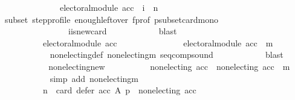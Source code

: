 \begin{isabellebody}
\ \ \ \ \ \ \ \ \ \ \ \ \ \ {\isacharparenleft}{\kern0pt}electoral{\isacharunderscore}{\kern0pt}module\ acc\ {\isasymlongrightarrow}\ i\ {\isacharless}{\kern0pt}\ n{\isacharparenright}{\kern0pt}{\isachardoublequoteclose}\ \isanewline
\ \ \ \ \ \ \ \ \ \ \isamarkupfalse%
\ subset\ step{\isacharunderscore}{\kern0pt}profile\ enough{\isacharunderscore}{\kern0pt}leftover\ f{\isacharunderscore}{\kern0pt}prof\ psubset{\isacharunderscore}{\kern0pt}card{\isacharunderscore}{\kern0pt}mono\isanewline
\ \ \ \ \ \ \ \ \ \ \ \ \ \ \ \ i{\isacharunderscore}{\kern0pt}is{\isacharunderscore}{\kern0pt}new{\isacharunderscore}{\kern0pt}card\isanewline
\ \ \ \ \ \ \ \ \ \ \isamarkupfalse%
\ blast\isanewline
\ \ \ \ \ \ \ \ \isamarkupfalse%
\ \isamarkupfalse%
\isanewline
\ \ \ \ \ \ \ \ \ \ {\isachardoublequoteopen}electoral{\isacharunderscore}{\kern0pt}module\ acc\ {\isasymlongrightarrow}\isanewline
\ \ \ \ \ \ \ \ \ \ \ \ \ \ electoral{\isacharunderscore}{\kern0pt}module\ {\isacharparenleft}{\kern0pt}acc\ {\isasymtriangleright}\ m{\isacharparenright}{\kern0pt}{\isachardoublequoteclose}\ \isanewline
\ \ \ \ \ \ \ \ \ \ \isamarkupfalse%
\ non{\isacharunderscore}{\kern0pt}electing{\isacharunderscore}{\kern0pt}def\ non{\isacharunderscore}{\kern0pt}electing{\isacharunderscore}{\kern0pt}m\ seq{\isacharunderscore}{\kern0pt}comp{\isacharunderscore}{\kern0pt}sound\isanewline
\ \ \ \ \ \ \ \ \ \ \isamarkupfalse%
\ blast\isanewline
\ \ \ \ \ \ \ \ \isamarkupfalse%
\ \isamarkupfalse%
\ non{\isacharunderscore}{\kern0pt}electing{\isacharunderscore}{\kern0pt}new{\isacharcolon}{\kern0pt}\isanewline
\ \ \ \ \ \ \ \ \ \ {\isachardoublequoteopen}non{\isacharunderscore}{\kern0pt}electing\ acc\ {\isasymlongrightarrow}\ non{\isacharunderscore}{\kern0pt}electing\ {\isacharparenleft}{\kern0pt}acc\ {\isasymtriangleright}\ m{\isacharparenright}{\kern0pt}{\isachardoublequoteclose}\isanewline
\ \ \ \ \ \ \ \ \ \ \isamarkupfalse%
\ {\isacharparenleft}{\kern0pt}simp\ add{\isacharcolon}{\kern0pt}\ non{\isacharunderscore}{\kern0pt}electing{\isacharunderscore}{\kern0pt}m{\isacharparenright}{\kern0pt}\isanewline
\ \ \ \ \ \ \ \ \isamarkupfalse%
\ \isamarkupfalse%
\isanewline
\ \ \ \ \ \ \ \ \ \ {\isachardoublequoteopen}{\isacharparenleft}{\kern0pt}n\ {\isacharequal}{\kern0pt}\ card\ {\isacharparenleft}{\kern0pt}defer\ acc\ A\ p{\isacharparenright}{\kern0pt}\ {\isasymand}\ non{\isacharunderscore}{\kern0pt}electing\ acc\ {\isasymand}\isanewline

\end{isabellebody}

